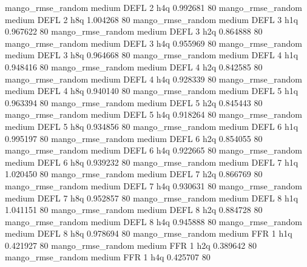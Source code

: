 mango_rmse_random     medium     DEFL                 2                  h4q  0.992681 80
mango_rmse_random     medium     DEFL                 2                  h8q  1.004268 80
mango_rmse_random     medium     DEFL                 3                  h1q  0.967622 80
mango_rmse_random     medium     DEFL                 3                  h2q  0.864888 80
mango_rmse_random     medium     DEFL                 3                  h4q  0.955969 80
mango_rmse_random     medium     DEFL                 3                  h8q  0.964668 80
mango_rmse_random     medium     DEFL                 4                  h1q  0.948416 80
mango_rmse_random     medium     DEFL                 4                  h2q  0.842585 80
mango_rmse_random     medium     DEFL                 4                  h4q  0.928339 80
mango_rmse_random     medium     DEFL                 4                  h8q  0.940140 80
mango_rmse_random     medium     DEFL                 5                  h1q  0.963394 80
mango_rmse_random     medium     DEFL                 5                  h2q  0.845443 80
mango_rmse_random     medium     DEFL                 5                  h4q  0.918264 80
mango_rmse_random     medium     DEFL                 5                  h8q  0.934856 80
mango_rmse_random     medium     DEFL                 6                  h1q  0.995197 80
mango_rmse_random     medium     DEFL                 6                  h2q  0.854055 80
mango_rmse_random     medium     DEFL                 6                  h4q  0.922665 80
mango_rmse_random     medium     DEFL                 6                  h8q  0.939232 80
mango_rmse_random     medium     DEFL                 7                  h1q  1.020450 80
mango_rmse_random     medium     DEFL                 7                  h2q  0.866769 80
mango_rmse_random     medium     DEFL                 7                  h4q  0.930631 80
mango_rmse_random     medium     DEFL                 7                  h8q  0.952857 80
mango_rmse_random     medium     DEFL                 8                  h1q  1.041151 80
mango_rmse_random     medium     DEFL                 8                  h2q  0.884728 80
mango_rmse_random     medium     DEFL                 8                  h4q  0.945888 80
mango_rmse_random     medium     DEFL                 8                  h8q  0.978694 80
mango_rmse_random     medium      FFR                 1                  h1q  0.421927 80
mango_rmse_random     medium      FFR                 1                  h2q  0.389642 80
mango_rmse_random     medium      FFR                 1                  h4q  0.425707 80
